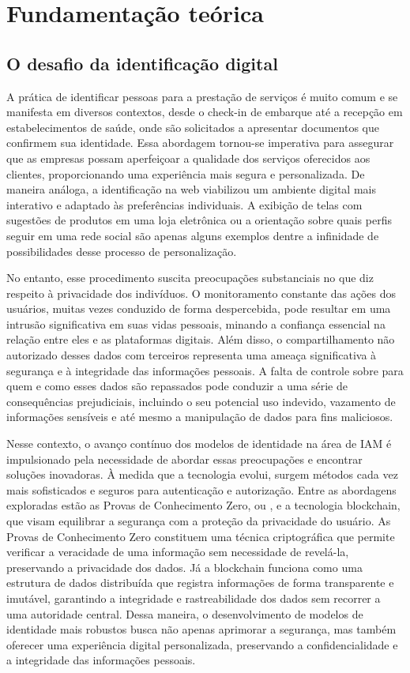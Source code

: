 \chapter{Fundamentação teórica}\label{ch:theory}

\section{O desafio da identificação digital}\label{section:desafio}

A prática de identificar pessoas para a prestação de serviços é muito comum e se manifesta em diversos contextos, desde o check-in de embarque até a recepção em estabelecimentos de saúde, onde são solicitados a apresentar documentos que confirmem sua identidade. Essa abordagem tornou-se imperativa para assegurar que as empresas possam aperfeiçoar a qualidade dos serviços oferecidos aos clientes, proporcionando uma experiência mais segura e personalizada. De maneira análoga, a identificação na web viabilizou um ambiente digital mais interativo e adaptado às preferências individuais. A exibição de telas com sugestões de produtos em uma loja eletrônica ou a orientação sobre quais perfis seguir em uma rede social são apenas alguns exemplos dentre a infinidade de possibilidades desse processo de personalização.
 
No entanto, esse procedimento suscita preocupações substanciais no que diz respeito à privacidade dos indivíduos. O monitoramento constante das ações dos usuários, muitas vezes conduzido de forma despercebida, pode resultar em uma intrusão significativa em suas vidas pessoais, minando a confiança essencial na relação entre eles e as plataformas digitais. Além disso, o compartilhamento não autorizado desses dados com terceiros representa uma ameaça significativa à segurança e à integridade das informações pessoais. A falta de controle sobre para quem e como esses dados são repassados pode conduzir a uma série de consequências prejudiciais, incluindo o seu potencial uso indevido, vazamento de informações sensíveis e até mesmo a manipulação de dados para fins maliciosos.

Nesse contexto, o avanço contínuo dos modelos de identidade na área de \acs{IAM} é impulsionado pela necessidade de abordar essas preocupações e encontrar soluções inovadoras. À medida que a tecnologia evolui, surgem métodos cada vez mais sofisticados e seguros para autenticação e autorização. Entre as abordagens exploradas estão as Provas de Conhecimento Zero, ou , e a tecnologia blockchain, que visam equilibrar a segurança com a proteção da privacidade do usuário. As Provas de Conhecimento Zero constituem uma técnica criptográfica que permite verificar a veracidade de uma informação sem necessidade de revelá-la, preservando a privacidade dos dados. Já a blockchain funciona como uma estrutura de dados distribuída que registra informações de forma transparente e imutável, garantindo a integridade e rastreabilidade dos dados sem recorrer a uma autoridade central. Dessa maneira, o desenvolvimento de modelos de identidade mais robustos busca não apenas aprimorar a segurança, mas também oferecer uma experiência digital personalizada, preservando a confidencialidade e a integridade das informações pessoais.

